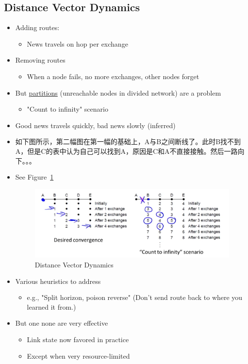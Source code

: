 \documentclass[12pt]{ctexart}   %
\begin{document}
	\subsection{Distance Vector Dynamics}
	\begin{itemize}
		\item Adding routes:
		\begin{itemize}
			\item News travels on hop per exchange
		\end{itemize}
		
		\item Removing routes
		\begin{itemize}
			\item When a node fails, no more exchanges, other nodes forget
		\end{itemize}
		
		\item But \underline{partitions} (unreachable nodes in divided network) are a problem
		\begin{itemize}
			\item "Count to infinity" scenario
		\end{itemize}
		
		\item Good news travels quickly, bad news slowly (inferred)
		\item 如下图所示，第二幅图在第一幅的基础上，A与B之间断线了。此时B找不到A，但是C的表中认为自己可以找到A，原因是C和A不直接接触。然后一路向下。。。
		\item See Figure~\ref{fig:5-4-7}
			
		\begin{figure}[h!] %
		\centering
		 \includegraphics[scale=0.7]{images/5-4-7}
		\caption{ Distance Vector Dynamics }
		 \label{fig:5-4-7}
		 \end{figure}
		 
		 \item Various heuristics to address
		 \begin{itemize}
		 	\item e.g., "Split horizon, poison reverse" (Don't send route back to where you learned it from.)
		 \end{itemize}
		 
		 \item But one none are very effective
		 \begin{itemize}
		 	\item Link state now favored in practice
		 	\item Except when very resource-limited
		 \end{itemize}
	\end{itemize}
	
\end{document}
